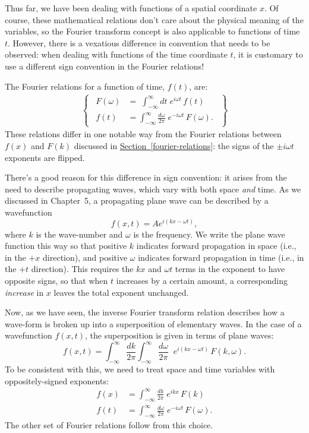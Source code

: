 \documentclass[10pt,a4paper]{article}
\begin{document}
Thus far, we have been dealing with functions of a spatial coordinate
$x$. Of course, these mathematical relations don't care about the
physical meaning of the variables, so the Fourier transform concept is
also applicable to functions of time $t$. However, there is a
vexatious difference in convention that needs to be observed: when
dealing with functions of the time coordinate $t$, it is customary to
use a different sign convention in the Fourier relations!

The Fourier relations for a function of time, $f(t)$, are:
\begin{align}
\left\{\;\,\begin{aligned}F(\omega) &= \;\int_{-\infty}^\infty dt\; e^{i\omega t}\, f(t) \\
f(t) &= \int_{-\infty}^\infty \frac{d\omega}{2\pi}\; e^{-i\omega t}\, F(\omega).\end{aligned}\;\,\right\}
\end{align}
These relations differ in one notable way from the Fourier relations
between $f(x)$ and $F(k)$ discussed in
\hyperref[fourier-relations]{Section~\ref{fourier-relations}}: the
signs of the $\pm i \omega t$ exponents are flipped.

There's a good reason for this difference in sign convention: it
arises from the need to describe propagating waves, which vary with
both space \emph{and} time. As we discussed in Chapter~5, a
propagating plane wave can be described by a wavefunction
\begin{equation}
  f(x,t) = A e^{i(kx - \omega t)},
\end{equation}
where $k$ is the wave-number and $\omega$ is the frequency. We write
the plane wave function this way so that positive $k$ indicates
forward propagation in space (i.e., in the $+x$ direction), and
positive $\omega$ indicates forward propagation in time (i.e., in the
$+t$ direction). This requires the $kx$ and $\omega t$ terms in the
exponent to have opposite signs, so that when $t$ increases by a
certain amount, a corresponding \emph{increase} in $x$ leaves the
total exponent unchanged.

Now, as we have seen, the inverse Fourier transform relation describes
how a wave-form is broken up into a superposition of elementary waves.
In the case of a wavefunction $f(x,t)$, the superposition is given in
terms of plane waves:
\begin{equation}
f(x,t) = \int_{-\infty}^\infty \frac{dk}{2\pi} \int_{-\infty}^\infty \frac{d\omega}{2\pi}\;\; e^{i(kx-\omega t)}\, F(k,\omega).
\end{equation}
To be consistent with this, we need to treat space and time variables
with oppositely-signed exponents:
\begin{align}
  f(x) &= \int_{-\infty}^\infty \frac{dk}{2\pi}\; e^{ikx}\, F(k) \\
  f(t) &= \int_{-\infty}^\infty \frac{d\omega}{2\pi}\; e^{-i\omega t}\, F(\omega).
\end{align}
The other set of Fourier relations follow from this choice.
\end{document}
